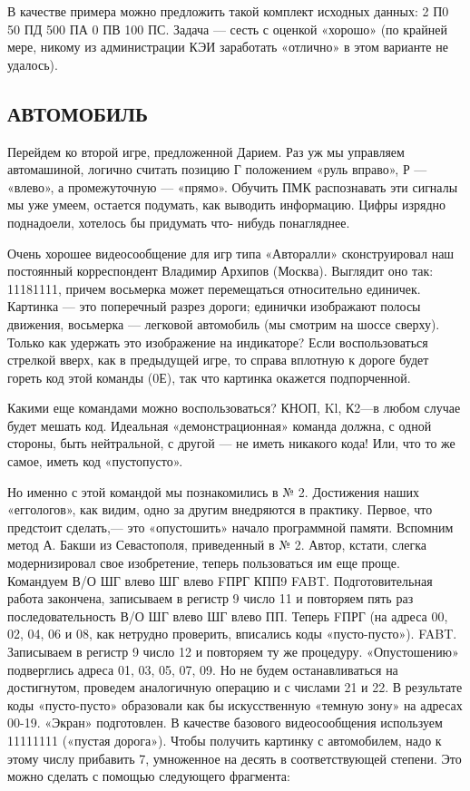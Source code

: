 \documentclass[11pt,a4paper,oneside]{article}
\begin{document}
В качестве примера можно предложить такой комплект исходных данных: 2 П0 50 ПД 500 ПА 0 ПВ 100 ПС. Задача — сесть с оценкой «хорошо» (по крайней мере, никому из администрации КЭИ заработать «отлично» в этом варианте не удалось).

\subsection{АВТОМОБИЛЬ}
Перейдем ко второй игре, предложенной Дарием. Раз уж мы управляем автомашиной, логично считать позицию Г положением «руль вправо», Р — «влево», а промежуточную — «прямо». Обучить ПМК распознавать эти сигналы мы уже умеем, остается подумать, как выводить информацию. Цифры изрядно поднадоели, хотелось бы придумать что- нибудь понагляднее.

Очень хорошее видеосообщение для игр типа «Авторалли» сконструировал наш постоянный корреспондент Владимир Архипов (Москва). Выглядит оно так: 11181111, причем восьмерка может перемещаться относительно единичек. Картинка — это поперечный разрез дороги; единички изображают полосы движения, восьмерка — легковой автомобиль (мы смотрим на шоссе сверху). Только как удержать это изображение на индикаторе? Если воспользоваться стрелкой вверх, как в предыдущей игре, то справа вплотную к дороге будет гореть код этой команды (0Е), так что картинка окажется подпорченной.

Какими еще командами можно воспользоваться? КНОП, Kl, К2—в любом случае будет мешать код. Идеальная «демонстрационная» команда должна, с одной стороны, быть нейтральной, с другой — не иметь никакого кода! Или, что то же самое, иметь код «пустопусто».

Но именно с этой командой мы познакомились в № 2. Достижения наших «еггологов», как видим, одно за другим внедряются в практику. Первое, что предстоит сделать,— это «опустошить» начало программной памяти. Вспомним метод А. Бакши из Севастополя, приведенный в № 2. Автор, кстати, слегка модернизировал свое изобретение, теперь пользоваться им еще проще. Командуем В/О ШГ влево ШГ влево FПРГ КПП9 FABT. Подготовительная работа закончена, записываем в регистр 9 число 11 и повторяем пять раз последовательность В/О ШГ влево ШГ влево ПП. Теперь FПРГ (на адреса 00, 02, 04, 06 и 08, как нетрудно проверить, вписались коды «пусто-пусто»). FABT. Записываем в регистр 9 число 12 и повторяем ту же процедуру. «Опустошению» подверглись адреса 01, 03, 05, 07, 09. Но не будем останавливаться на достигнутом, проведем аналогичную операцию и с числами 21 и 22. В результате коды «пусто-пусто» образовали как бы искусственную «темную зону» на адресах 00-19. «Экран» подготовлен.
В качестве базового видеосообщения используем 11111111 («пустая дорога»). Чтобы получить картинку с автомобилем, надо к этому числу прибавить 7, умноженное на десять в соответствующей степени. Это можно сделать с помощью следующего фрагмента:
\end{document}
